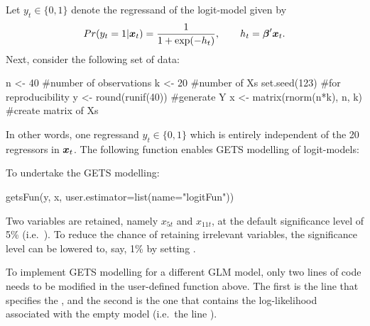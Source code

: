 Let $y_t \in \{0,1\}$ denote the regressand of the logit-model given by
%
\begin{equation}
	Pr(y_t=1|\boldsymbol{x}_t) = \frac{1}{1+\exp(-h_t)}, \qquad h_t = \boldsymbol{\beta}'\boldsymbol{x}_t.
\end{equation}
%
Next, consider the following set of data:
%
\begin{example}
  n <- 40 #number of observations
  k <- 20 #number of Xs
  set.seed(123) #for reproducibility
  y <- round(runif(40)) #generate Y
  x <- matrix(rnorm(n*k), n, k) #create matrix of Xs
\end{example}
%
In other words, one regressand $y_t \in \{0,1\}$ which is entirely independent of the 20 regressors in $\boldsymbol{x}_t$. The following function enables GETS modelling of logit-models:

%
To undertake the GETS modelling:
%
\begin{example}
  getsFun(y, x, user.estimator=list(name="logitFun"))
\end{example}
%
Two variables are retained, namely $x_{5t}$ and $x_{11t}$, at the default significance level of 5\% (i.e.\ ). To reduce the chance of retaining irrelevant variables, the significance level can be lowered to, say, 1\% by setting .

To implement GETS modelling for a different GLM model, only two lines of code needs to be modified in the user-defined function above. The first is the line that specifies the , and the second is the one that contains the log-likelihood associated with the empty model (i.e.\ the line ).

